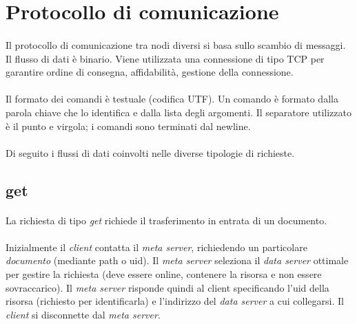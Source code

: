 \documentclass[11pt,a4paper,english]{article}
\begin{document}
\section{Protocollo di comunicazione}

\paragraph{} Il protocollo di comunicazione tra nodi diversi si basa sullo scambio di messaggi. Il flusso di dati è binario. Viene utilizzata una connessione di tipo TCP per garantire ordine di consegna, affidabilità, gestione della connessione. 

\paragraph{} Il formato dei comandi è testuale (codifica UTF). Un comando è formato dalla parola chiave che lo identifica e dalla lista degli argomenti. Il separatore utilizzato è il punto e virgola; i comandi sono terminati dal newline.

\paragraph{} Di seguito i flussi di dati coinvolti nelle diverse tipologie di richieste.

\subsection{get}

\paragraph{} La richiesta di tipo \emph{get} richiede il trasferimento in entrata di un documento. 

\paragraph{} Inizialmente il \emph{client} contatta il \emph{meta server}, richiedendo un particolare \emph{documento} (mediante path o uid). Il \emph{meta server} seleziona il \emph{data server} ottimale per gestire la richiesta (deve essere online, contenere la risorsa e non essere sovraccarico). Il \emph{meta server} risponde quindi al client specificando l'uid della risorsa (richiesto per identificarla) e l'indirizzo del \emph{data server} a cui collegarsi. Il \emph{client} si disconnette dal \emph{meta server}.
\end{document}
